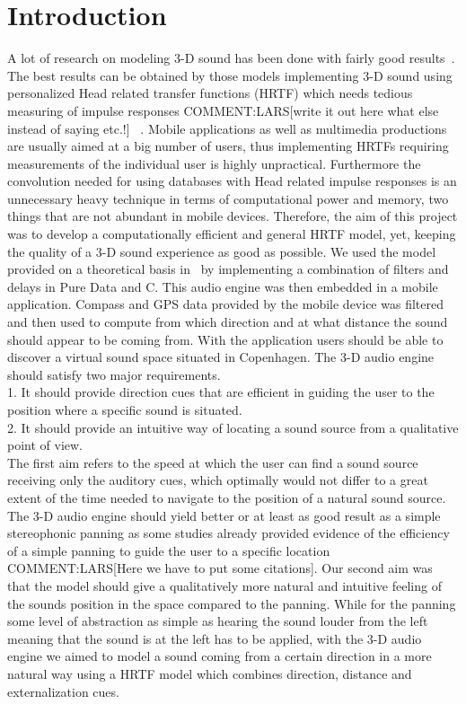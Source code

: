\documentclass[journal]{IEEEtran}
\begin{document}
\section{Introduction}
A lot of research on modeling 3-D sound has been done with fairly good results~\cite{begault19943}. The best results can be obtained by those models implementing 3-D sound using personalized Head related transfer functions (HRTF) which needs tedious measuring of impulse responses COMMENT:LARS[write it out here what else instead of saying etc.!] ~\cite{Meshram2014}. Mobile applications as well as multimedia productions are usually aimed at a big number of users, thus implementing HRTFs requiring measurements of the individual user is highly unpractical. Furthermore the convolution needed for using databases with Head related impulse responses is an unnecessary heavy technique in terms of computational power and memory, two things that are not abundant in mobile devices. Therefore, the aim of this project was to develop a computationally efficient and general HRTF model, yet, keeping the quality of a 3-D sound experience as good as possible. We used the model provided on a theoretical basis in~\cite{Brown1997} by implementing a combination of filters and delays in Pure Data and C. This audio engine was then embedded in a mobile application. Compass and GPS data provided by the mobile device was filtered and then used to compute from which direction and at what distance the sound should appear to be coming from. With the application users should be able to discover a virtual sound space situated in Copenhagen. The 3-D audio engine should satisfy two major requirements. 
\\1. It should provide direction cues that are efficient in guiding the user to the position where a specific sound is situated.\\2. It should provide an intuitive way of locating a sound source from a qualitative point of view. \\The first aim refers to the speed at which the user can find a sound source receiving only the auditory cues, which optimally would not differ to a great extent of the time needed to navigate to the position of a natural sound source. The 3-D audio engine should yield better or at least as good result as a simple stereophonic panning as some studies already provided evidence of the efficiency of a simple panning to guide the user to a specific location COMMENT:LARS[Here we have to put some citations]\cite{}. Our second aim was that the model should give a qualitatively more natural and intuitive feeling of the sounds position in the space compared to the panning. While for the panning some level of abstraction as simple as hearing the sound louder from the left meaning that the sound is at the left has to be applied, with the 3-D audio engine we aimed to model a sound coming from a certain direction in a more natural way using a HRTF model which combines direction, distance and externalization cues.
\end{document}
